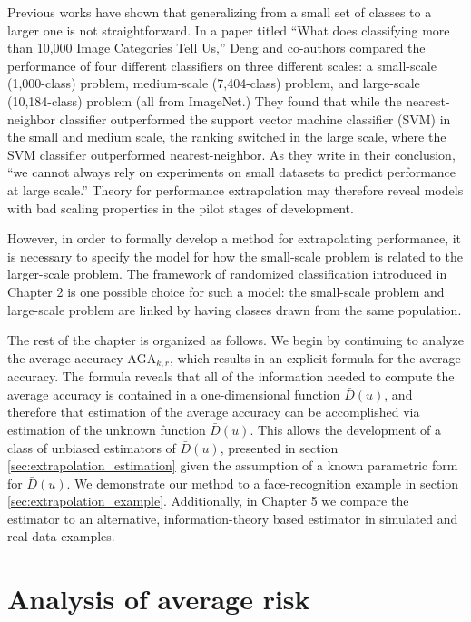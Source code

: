 Previous works have shown that generalizing from a small set of
classes to a larger one is not straightforward. In a paper titled
``What does classifying more than 10,000 Image Categories Tell Us,''
Deng and co-authors compared the performance of four different
classifiers on three different scales: a small-scale (1,000-class)
problem, medium-scale (7,404-class) problem, and large-scale
(10,184-class) problem (all from ImageNet.)  They found that while the
nearest-neighbor classifier outperformed the support vector machine
classifier (SVM) in the small and medium scale, the ranking switched
in the large scale, where the SVM classifier outperformed
nearest-neighbor.  As they write in their conclusion, ``we cannot
always rely on experiments on small datasets to predict performance at
large scale.'' Theory for performance extrapolation may therefore
reveal models with bad scaling properties in the pilot stages of
development.

However, in order to formally develop a method for extrapolating
performance, it is necessary to specify the model for how the
small-scale problem is related to the larger-scale problem.  The
framework of randomized classification introduced in Chapter 2 is one
possible choice for such a model: the small-scale problem and
large-scale problem are linked by having classes drawn from the same
population.

The rest of the chapter is organized as follows.  We begin by
continuing to analyze the average accuracy $\text{AGA}_{k, r}$, which
results in an explicit formula for the average accuracy.  The formula
reveals that all of the information needed to compute the average
accuracy is contained in a one-dimensional function $\bar{D}(u)$, and
therefore that estimation of the average accuracy can be accomplished
via estimation of the unknown function $\bar{D}(u)$.  This allows the
development of a class of unbiased estimators of $\bar{D}(u)$,
presented in section \ref{sec:extrapolation_estimation} given the
assumption of a known parametric form for $\bar{D}(u)$.  
We demonstrate our method to a face-recognition
example in section \ref{sec:extrapolation_example}.  Additionally, in
Chapter 5 %
we compare the estimator to an alternative, information-theory
based estimator in simulated and real-data examples.

\section{Analysis of average risk}

